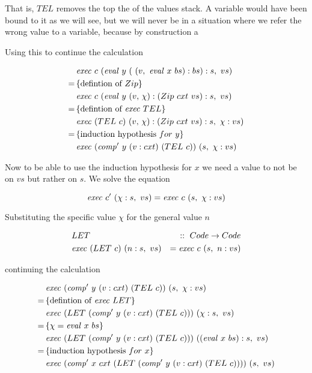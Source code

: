 \documentclass {article}
\begin{document}
That is, $TEL$ removes the top the of the values stack.
A variable would have been bound to it as we will see,
but we will never be in a situation where we refer the wrong
value to a variable, because by construction a 

Using this to continue the calculation

\begin{align*}
&\mathit{exec\ } c\ (\mathit{eval\ }  y\ (\ (v,\ \mathit{eval\ }  x\ bs) :bs) : s,\ vs) \\
=\, & \{ \mbox{defintion of}\ Zip \} \\
&\mathit{exec\ } c\ (\mathit{eval\ }  y\ (v,\, \chi):(Zip\ cxt\ vs) : s,\ vs) \\
=\, & \{ \mbox{defintion of}\ \mathit{exec\ } TEL\} \\
&\mathit{exec\ } (TEL\ c)\ (v,\, \chi):(Zip\ cxt\ vs) : s,\ \chi : vs) \\
=\, & \{ \mbox{induction hypothesis}\ for\ y \} \\
&\mathit{exec\ } (\mathit{comp'\ }  y\ (v:cxt)\ (TEL\ c))\ (s,\ \chi : vs)
\end{align*}

Now to be able to use the induction hypothesis for $x$
we need a value to not be on $vs$ but rather on $s$.
We solve the equation 

\[ \Exec c'\ (\chi : s,\ vs) = \Exec c\ (s,\ \chi : vs) \]

Substituting the specific value $\chi$ for the general value $n$

\begin{eqnarray*}
 	&LET\ &::\ Code \rightarrow Code \\
 	&\mathit{exec\ } (LET\ c)\ (n:s,\ vs) &= \mathit{exec\ } c\ (s,\ n:vs)
\end{eqnarray*}

continuing the calculation

\begin{align*}
&\Exec (\Compp  y\ (v:cxt)\ (TEL\ c))\ (s,\ \chi : vs) \\
=\, & \{\mbox{defintion of}\ \Exec LET\} \\
&\Exec (LET\ (\Compp  y\ (v:cxt)\ (TEL\ c)))\ (\chi : s,\ vs)\\
=\, & \{ \chi = \evalf  x\ bs \} \\
&\Exec (LET\ (\Compp  y\ (v:cxt)\ (TEL\ c)))\ ((\evalf  x\ bs) : s,\ vs)\\
=\, & \{ \mbox{induction hypothesis}\ for\ x \} \\
&\Exec (\Compp  x\ cxt\ (LET\ (\Compp  y\ (v:cxt)\ (TEL\ c))))\ (s,\ vs)
\end{align*}
\end{document}
